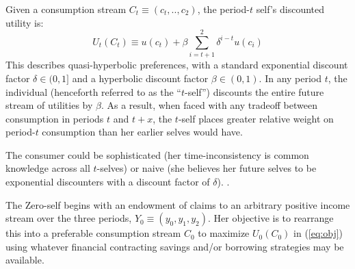 \documentclass[11pt,english]{article}
\theoremstyle{plain}
\theoremstyle{definition}
\begin{document}
Given a consumption stream $C_{t}\equiv\left(c_{t},..,c_{2}\right)$,
the period-$t$ self's discounted utility is: 
\begin{equation}
U_{t}\left(C_{t}\right)\equiv u\left(c_{t}\right)+\beta\sum\limits _{i=t+1}^{2}\delta^{i-t}u\left(c_{i}\right)\label{eq:obj}
\end{equation}
This describes quasi-hyperbolic preferences, with a standard exponential
discount factor $\delta\in(0,1]$ and a hyperbolic discount factor
$\beta\in(0,1)$. In any period $t$, the individual (henceforth referred
to as the ``$t$-self'') discounts the entire future stream of utilities
by $\beta$. As a result, when faced with any tradeoff between consumption
in periods $t$ and $t+x$, the $t$-self places greater relative
weight on period-$t$ consumption than her earlier selves would have. 

The consumer could be sophisticated (her time-inconsistency is common
knowledge across all $t$-selves) or naive (she believes her future
selves to be exponential discounters with a discount factor of $\delta$).
\citep{odonoghue_choice_2001}.

The Zero-self begins with an endowment of claims to an arbitrary positive
income stream over the three periods, $Y_{0}\equiv\left(y_{0},y_{1},y_{2}\right)$.
Her objective is to rearrange this into a preferable consumption stream
$C_{0}$ to maximize $U_{0}(C_{0})$ in (\ref{eq:obj}) using whatever
financial contracting savings and/or borrowing strategies may be available.
\end{document}
